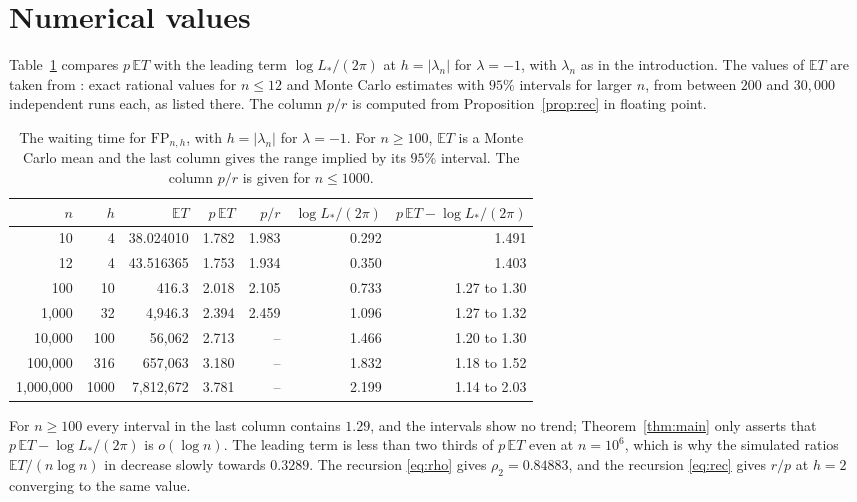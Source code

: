 \documentclass[11pt]{amsart}
\theoremstyle{remark}
\numberwithin{equation}{section}
\newcommand{\EE}{\mathbb{E}}
\newcommand{\FP}{\mathrm{FP}}
\begin{document}
\section{Numerical values}\label{sec:numerics}

Table~\ref{tab:num} compares $p\,\EE T$ with the leading term $\log L_*/(2\pi)$ at $h=|\lambda_n|$ for $\lambda=-1$, with $\lambda_n$ as in the introduction. The values of $\EE T$ are taken from \cite{Sh26}: exact rational values for $n\le12$ and Monte Carlo estimates with $95\%$ intervals for larger $n$, from between $200$ and $30{,}000$ independent runs each, as listed there. The column $p/r$ is computed from Proposition~\ref{prop:rec} in floating point.

\begin{table}[h]
\centering
\begin{tabular}{rrrrrrr}
\toprule
$n$ & $h$ & $\EE T$ & $p\,\EE T$ & $p/r$ & $\log L_*/(2\pi)$ & $p\,\EE T-\log L_*/(2\pi)$\\
\midrule
10 & 4 & 38.024010 & 1.782 & 1.983 & 0.292 & 1.491\\
12 & 4 & 43.516365 & 1.753 & 1.934 & 0.350 & 1.403\\
100 & 10 & 416.3 & 2.018 & 2.105 & 0.733 & 1.27 to 1.30\\
1{,}000 & 32 & 4{,}946.3 & 2.394 & 2.459 & 1.096 & 1.27 to 1.32\\
10{,}000 & 100 & 56{,}062 & 2.713 & -- & 1.466 & 1.20 to 1.30\\
100{,}000 & 316 & 657{,}063 & 3.180 & -- & 1.832 & 1.18 to 1.52\\
1{,}000{,}000 & 1000 & 7{,}812{,}672 & 3.781 & -- & 2.199 & 1.14 to 2.03\\
\bottomrule
\end{tabular}
\caption{The waiting time for $\FP_{n,h}$, with $h=|\lambda_n|$ for $\lambda=-1$. For $n\ge100$, $\EE T$ is a Monte Carlo mean and the last column gives the range implied by its $95\%$ interval. The column $p/r$ is given for $n\le1000$.}\label{tab:num}
\end{table}

For $n\ge100$ every interval in the last column contains $1.29$, and the intervals show no trend; Theorem~\ref{thm:main} only asserts that $p\,\EE T-\log L_*/(2\pi)$ is $o(\log n)$. The leading term is less than two thirds of $p\,\EE T$ even at $n=10^6$, which is why the simulated ratios $\EE T/(n\log n)$ in \cite{Sh26} decrease slowly towards $0.3289$. The recursion \eqref{eq:rho} gives $\rho_2=0.84883$, and the recursion \eqref{eq:rec} gives $r/p$ at $h=2$ converging to the same value.
\end{document}
